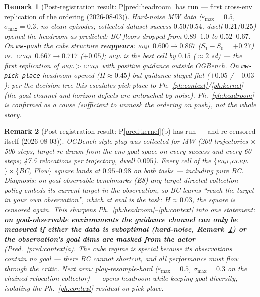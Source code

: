 \documentclass[10pt]{article}
\newtheorem{remark}{Remark}
\begin{document}
\begin{remark}[Post-registration result: P\ref{pred:headroom} has run --- first cross-env
replication of the ordering (2026-08-03)]\label{rem:headroom}
Hard-noise MW data ($\varepsilon_{\max}{=}0.5$, $\sigma_{\max}{=}0.3$, no clean episodes;
collected dataset success $0.50/0.54$, dwell $0.21/0.25$) opened the headroom as
predicted: BC floors dropped from $0.89$--$1.0$ to $0.52$--$0.67$. On \texttt{mw-push}
the cube structure \textbf{reappears}: \textsc{biql} $0.600\to0.867$
($S_1-S_0=+0.27$) vs.\ \textsc{gciql} $0.667\to0.717$ ($+0.05$); \textsc{biql} is the
best cell by $0.15$ ($\approx2$ sd) --- the first replication of
\textsc{biql}$>$\textsc{gciql} with positive guidance outside OGBench.
On \texttt{mw-pick-place} headroom opened ($H\approx0.45$) but guidance stayed flat
($+0.05$ / $-0.03$): per the decision tree this escalates pick-place to
Ph.~\ref{ph:context}/\ref{ph:kernel} (the goal channel and horizon defects are untouched
by noise). Ph.~\ref{ph:headroom} is confirmed as \emph{a} cause (sufficient to unmask the
ordering on push), not the whole story.
\end{remark}

\begin{remark}[Post-registration result: P\ref{pred:kernel}(b) has run --- and re-censored
itself (2026-08-03)]\label{rem:resample}
OGBench-style play was collected for MW (200 trajectories $\times$ 500 steps, target
re-drawn from the env goal space on every success and every 60 steps; 47.5 relocations
per trajectory, dwell $0.095$). Every cell of the
$\{$\textsc{biql},\textsc{gciql}$\}\times\{$BC, Flow$\}$ square lands at
$0.95$--$0.98$ on both tasks --- \emph{including pure BC}. Diagnosis: on
goal-\emph{observable} benchmarks (E8) any target-directed collection policy embeds its
current target in the observation, so BC learns ``reach the target in your own
observation'', which at eval \emph{is} the task: $H\approx0.03$, the square is censored
again. This sharpens Ph.~\ref{ph:headroom}--\ref{ph:context} into one statement:
\textbf{on goal-observable environments the guidance channel can only be measured if
either the data is suboptimal (hard-noise, Remark~\ref{rem:headroom}) or the observation's
goal dims are masked from the actor} (Pred.~\ref{pred:context}a). The cube regime is
special because its observations contain no goal --- there BC \emph{cannot} shortcut, and
all performance must flow through the critic. Next arm: play-resample-hard
($\varepsilon_{\max}{=}0.5$, $\sigma_{\max}{=}0.3$ on the chained-relocation collector) ---
opens headroom while keeping goal diversity, isolating the Ph.~\ref{ph:context} residual
on pick-place.
\end{remark}
\end{document}
